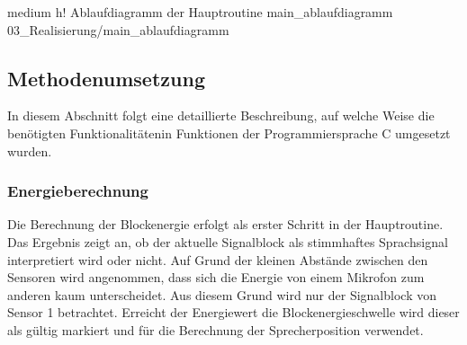          {medium}                                              %
         {h!}                                                  %
         {Ablaufdiagramm der Hauptroutine }       %
         {main_ablaufdiagramm}                                 %
         {03_Realisierung/main_ablaufdiagramm}                 %




\subsection{Methodenumsetzung}
\label{subsec:Methodenumsetzung}
In diesem Abschnitt folgt eine detaillierte Beschreibung, auf welche Weise die benötigten Funktionalitätenin Funktionen der Programmiersprache C umgesetzt wurden. 




\subsubsection{Energieberechnung}
Die Berechnung der Blockenergie erfolgt als erster Schritt in der Hauptroutine. Das Ergebnis zeigt an, ob der aktuelle Signalblock als stimmhaftes Sprachsignal interpretiert wird oder nicht. Auf Grund der kleinen Abstände zwischen den Sensoren wird angenommen, dass sich die Energie von einem Mikrofon zum anderen kaum unterscheidet. Aus diesem Grund wird nur der Signalblock von Sensor 1 betrachtet. Erreicht der Energiewert die Blockenergieschwelle  wird dieser als gültig markiert und für die Berechnung der Sprecherposition verwendet.

%  




